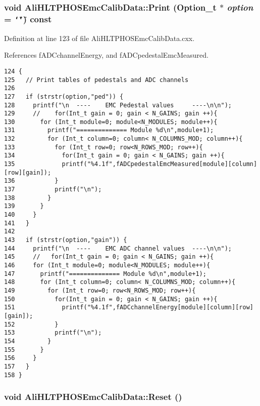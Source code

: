 \subsubsection{\setlength{\rightskip}{0pt plus 5cm}void Ali\-HLTPHOSEmc\-Calib\-Data::Print (Option\_\-t $\ast$ {\em option} = {\tt \char`\"{}\char`\"{}}) const\hspace{0.3cm}{\tt  [virtual]}}\label{classAliHLTPHOSEmcCalibData_AliHLTPHOSEmcCalibDataa6}




Definition at line 123 of file Ali\-HLTPHOSEmc\-Calib\-Data.cxx.

References f\-ADCchannel\-Energy, and f\-ADCpedestal\-Emc\-Measured.

\footnotesize\begin{verbatim}124 {
125   // Print tables of pedestals and ADC channels
126 
127   if (strstr(option,"ped")) {
128     printf("\n  ----    EMC Pedestal values     ----\n\n");
129     //    for(Int_t gain = 0; gain < N_GAINS; gain ++){
130       for (Int_t module=0; module<N_MODULES; module++){
131         printf("============== Module %d\n",module+1);
132         for (Int_t column=0; column< N_COLUMNS_MOD; column++){
133           for (Int_t row=0; row<N_ROWS_MOD; row++){
134             for(Int_t gain = 0; gain < N_GAINS; gain ++){
135             printf("%4.1f",fADCpedestalEmcMeasured[module][column][row][gain]);
136           }
137           printf("\n");
138         }
139       }
140     }
141   }
142 
143   if (strstr(option,"gain")) {
144     printf("\n  ----    EMC ADC channel values  ----\n\n");
145     //   for(Int_t gain = 0; gain < N_GAINS; gain ++){ 
146     for (Int_t module=0; module<N_MODULES; module++){
147       printf("============== Module %d\n",module+1);
148       for (Int_t column=0; column< N_COLUMNS_MOD; column++){
149         for (Int_t row=0; row<N_ROWS_MOD; row++){
150           for(Int_t gain = 0; gain < N_GAINS; gain ++){ 
151             printf("%4.1f",fADCchannelEnergy[module][column][row][gain]);
152           }
153           printf("\n");
154         }
155       }
156     }  
157   }
158 }
\end{verbatim}\normalsize 


\subsubsection{\setlength{\rightskip}{0pt plus 5cm}void Ali\-HLTPHOSEmc\-Calib\-Data::Reset ()}\label{classAliHLTPHOSEmcCalibData_AliHLTPHOSEmcCalibDataa5}





